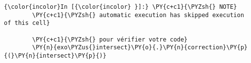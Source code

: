     \begin{Verbatim}[commandchars=\\\{\}]
{\color{incolor}In [{\color{incolor} }]:} \PY{c+c1}{\PYZsh{} NOTE}
        \PY{c+c1}{\PYZsh{} automatic execution has skipped execution of this cell}
        
        \PY{c+c1}{\PYZsh{} pour vérifier votre code}
        \PY{n}{exo\PYZus{}intersect}\PY{o}{.}\PY{n}{correction}\PY{p}{(}\PY{n}{intersect}\PY{p}{)}
\end{Verbatim}



    
    
    
